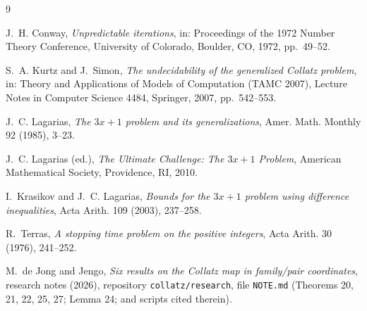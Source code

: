 \documentclass[11pt]{article}
\theoremstyle{definition}
\begin{document}
\begin{thebibliography}{9}

J.~H. Conway,
\emph{Unpredictable iterations},
in: Proceedings of the 1972 Number Theory Conference,
University of Colorado, Boulder, CO, 1972, pp.~49--52.

S.~A. Kurtz and J.~Simon,
\emph{The undecidability of the generalized Collatz problem},
in: Theory and Applications of Models of Computation (TAMC 2007),
Lecture Notes in Computer Science 4484, Springer, 2007, pp.~542--553.

J.~C. Lagarias,
\emph{The $3x+1$ problem and its generalizations},
Amer. Math. Monthly 92 (1985), 3--23.

J.~C. Lagarias (ed.),
\emph{The Ultimate Challenge: The $3x+1$ Problem},
American Mathematical Society, Providence, RI, 2010.

I.~Krasikov and J.~C. Lagarias,
\emph{Bounds for the $3x+1$ problem using difference inequalities},
Acta Arith. 109 (2003), 237--258.

R.~Terras,
\emph{A stopping time problem on the positive integers},
Acta Arith. 30 (1976), 241--252.

M.~de Jong and Jengo,
\emph{Six results on the Collatz map in family/pair coordinates},
research notes (2026), repository \texttt{collatz/research}, file \texttt{NOTE.md}
(Theorems 20, 21, 22, 25, 27; Lemma 24; and scripts cited therein).

\end{thebibliography}
\end{document}
